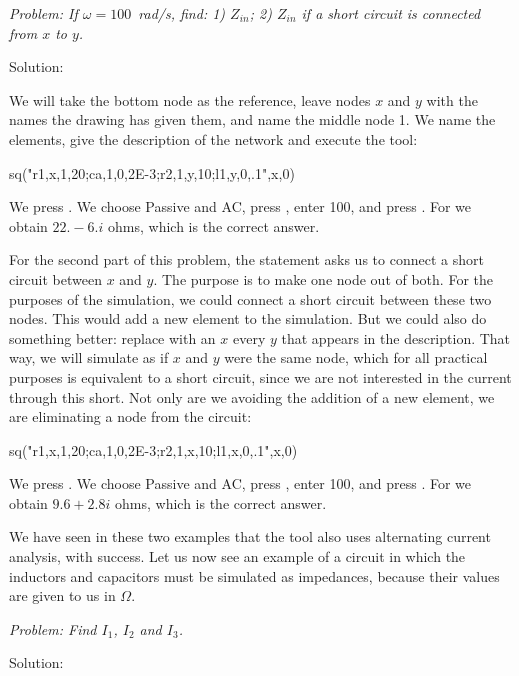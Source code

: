 
\emph{Problem: If $\omega = 100$~rad/s, find: 1) $Z_{in}$; 2)
$Z_{in}$ if a short circuit is connected from $x$ to $y$.}

Solution:

We will take the bottom node as the reference, leave nodes $x$ and
$y$ with the names the drawing has given them, and name the middle
node 1. We name the elements, give the description of the network
and execute the  tool:

\begin{entry}
sq\thevenin("r1,x,1,20;ca,1,0,2E-3;r2,1,y,10;l1,y,0,.1",x,0)
\end{entry}

We press . We choose Passive and AC, press ,
enter 100, and press . For  we obtain
$22. - 6.i$ ohms, which is the correct answer.

For the second part of this problem, the statement asks us to
connect a short circuit between $x$ and $y$. The purpose is to make
one node out of both. For the purposes of the simulation, we could
connect a short circuit between these two nodes. This would add a
new element to the simulation. But we could also do something
better: replace with an $x$ every $y$ that appears in the
description. That way, we will simulate as if $x$ and $y$ were the
same node, which for all practical purposes is equivalent to a short
circuit, since we are not interested in the current through this
short. Not only are we avoiding the addition of a new element, we
are eliminating a node from the circuit:

\begin{entry}
sq\thevenin("r1,x,1,20;ca,1,0,2E-3;r2,1,x,10;l1,x,0,.1",x,0)
\end{entry}

We press . We choose Passive and AC, press ,
enter 100, and press . For  we obtain
$9.6 + 2.8i$ ohms, which is the correct answer.

We have seen in these two examples that the  tool
also uses alternating current analysis, with success. Let us now see
an example of a circuit in which the inductors and capacitors must
be simulated as impedances, because their values are given to us in
$\Omega$.


\emph{Problem: Find $I_1$, $I_2$ and $I_3$.}

Solution:

